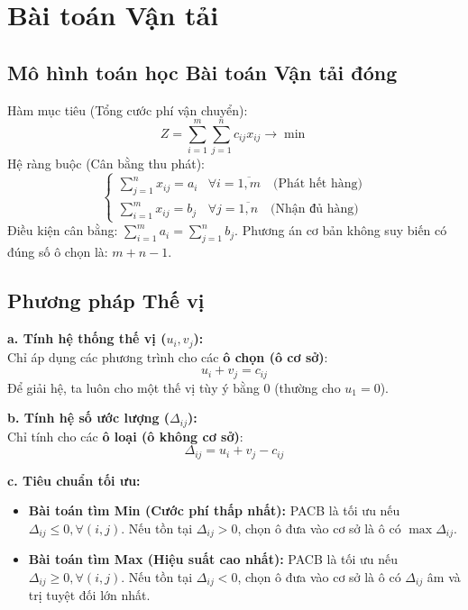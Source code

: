 \section{Bài toán Vận tải}
\subsection{Mô hình toán học Bài toán Vận tải đóng}
Hàm mục tiêu (Tổng cước phí vận chuyển):
\begin{equation}
    Z = \sum_{i=1}^{m} \sum_{j=1}^{n} c_{ij} x_{ij} \rightarrow \min
\end{equation}
Hệ ràng buộc (Cân bằng thu phát):
\begin{equation}
    \begin{cases}
        \sum_{j=1}^{n} x_{ij} = a_i & \forall i = \overline{1,m} \quad \text{(Phát hết hàng)} \\
        \sum_{i=1}^{m} x_{ij} = b_j & \forall j = \overline{1,n} \quad \text{(Nhận đủ hàng)}
    \end{cases}
\end{equation}
Điều kiện cân bằng: $\sum_{i=1}^{m} a_i = \sum_{j=1}^{n} b_j$.
Phương án cơ bản không suy biến có đúng số ô chọn là: $m + n - 1$.

\subsection{Phương pháp Thế vị}
\textbf{a. Tính hệ thống thế vị ($u_i, v_j$):}\\
Chỉ áp dụng các phương trình cho các \textbf{ô chọn (ô cơ sở)}:
\begin{equation}
    u_i + v_j = c_{ij}
\end{equation}
Để giải hệ, ta luôn cho một thế vị tùy ý bằng 0 (thường cho $u_1 = 0$).

\textbf{b. Tính hệ số ước lượng ($\Delta_{ij}$):}\\
Chỉ tính cho các \textbf{ô loại (ô không cơ sở)}:
\begin{equation}
    \Delta_{ij} = u_i + v_j - c_{ij}
\end{equation}

\textbf{c. Tiêu chuẩn tối ưu:}
\begin{itemize}
    \item \textbf{Bài toán tìm Min (Cước phí thấp nhất):} PACB là tối ưu nếu $\Delta_{ij} \le 0, \forall (i,j)$. Nếu tồn tại $\Delta_{ij} > 0$, chọn ô đưa vào cơ sở là ô có $\max \Delta_{ij}$.
    \item \textbf{Bài toán tìm Max (Hiệu suất cao nhất):} PACB là tối ưu nếu $\Delta_{ij} \ge 0, \forall (i,j)$. Nếu tồn tại $\Delta_{ij} < 0$, chọn ô đưa vào cơ sở là ô có $\Delta_{ij}$ âm và trị tuyệt đối lớn nhất.
\end{itemize}

